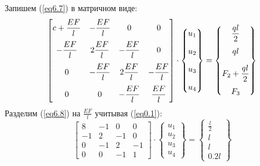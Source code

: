 Запишем (\ref{eq6.7}) в матричном виде:
\begin{equation}
    \label{eq6.8}
    \begin{bmatrix}
        c + \displaystyle \frac{EF}{l} & - \displaystyle \frac{EF}{l} & 0 & 0
        \\[10pt]
        - \displaystyle \frac{EF}{l} & 2 \displaystyle \frac{EF}{l} & - \displaystyle \frac{EF}{l} & 0
        \\[10pt]
        0 & - \displaystyle \frac{EF}{l} & 2 \displaystyle \frac{EF}{l} & - \displaystyle \frac{EF}{l}
        \\[10pt]
        0 & 0 & - \displaystyle \frac{EF}{l} & \displaystyle \frac{EF}{l}
    \end{bmatrix}
    \cdot
    \begin{Bmatrix}
        u_1
        \\[10pt]
        u_2
        \\[10pt]
        u_3
        \\[10pt]
        u_4
    \end{Bmatrix}
    =
    \begin{Bmatrix}
        \displaystyle \frac{ql}{2}
        \\[10pt]
        ql
        \\[10pt]
        F_2 + \displaystyle \frac{ql}{2}
        \\[10pt]
        F_3
    \end{Bmatrix}
\end{equation}
Разделим (\ref{eq6.8}) на $\displaystyle \frac{EF}{l}$ учитывая (\ref{eq0.1}):
\begin{equation}
    \label{eq6.9}
    \begin{bmatrix}
        8 & -1 & 0 & 0
        \\
        -1 & 2 & -1  & 0
        \\
        0 & -1 & 2 & -1
        \\
        0 & 0 & -1 & 1
    \end{bmatrix}
    \cdot
    \begin{Bmatrix}
        u_1
        \\
        u_2
        \\
        u_3
        \\
        u_4
    \end{Bmatrix}
    =
    \begin{Bmatrix}
        \displaystyle \frac{l}{2}
        \\
        l
        \\
        l
        \\
        0.2l
    \end{Bmatrix}
\end{equation}


